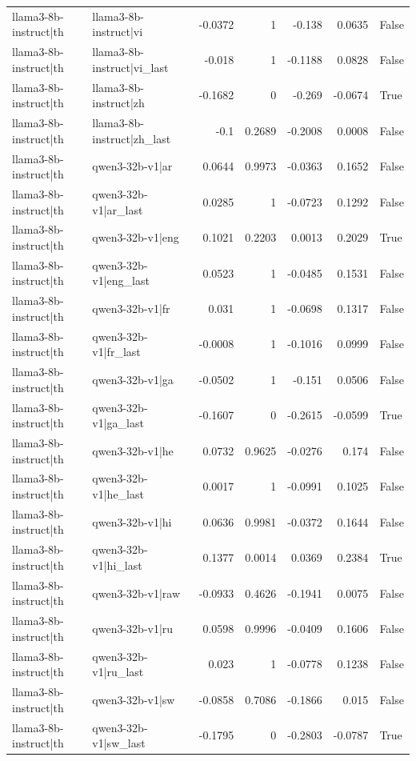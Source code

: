 \begin{table}
\begin{tabular}{l l r r r r l}
llama3-8b-instruct|th & llama3-8b-instruct|vi & -0.0372 & 1 & -0.138 & 0.0635 & False \\
llama3-8b-instruct|th & llama3-8b-instruct|vi_last & -0.018 & 1 & -0.1188 & 0.0828 & False \\
llama3-8b-instruct|th & llama3-8b-instruct|zh & -0.1682 & 0 & -0.269 & -0.0674 & True \\
llama3-8b-instruct|th & llama3-8b-instruct|zh_last & -0.1 & 0.2689 & -0.2008 & 0.0008 & False \\
llama3-8b-instruct|th & qwen3-32b-v1|ar & 0.0644 & 0.9973 & -0.0363 & 0.1652 & False \\
llama3-8b-instruct|th & qwen3-32b-v1|ar_last & 0.0285 & 1 & -0.0723 & 0.1292 & False \\
llama3-8b-instruct|th & qwen3-32b-v1|eng & 0.1021 & 0.2203 & 0.0013 & 0.2029 & True \\
llama3-8b-instruct|th & qwen3-32b-v1|eng_last & 0.0523 & 1 & -0.0485 & 0.1531 & False \\
llama3-8b-instruct|th & qwen3-32b-v1|fr & 0.031 & 1 & -0.0698 & 0.1317 & False \\
llama3-8b-instruct|th & qwen3-32b-v1|fr_last & -0.0008 & 1 & -0.1016 & 0.0999 & False \\
llama3-8b-instruct|th & qwen3-32b-v1|ga & -0.0502 & 1 & -0.151 & 0.0506 & False \\
llama3-8b-instruct|th & qwen3-32b-v1|ga_last & -0.1607 & 0 & -0.2615 & -0.0599 & True \\
llama3-8b-instruct|th & qwen3-32b-v1|he & 0.0732 & 0.9625 & -0.0276 & 0.174 & False \\
llama3-8b-instruct|th & qwen3-32b-v1|he_last & 0.0017 & 1 & -0.0991 & 0.1025 & False \\
llama3-8b-instruct|th & qwen3-32b-v1|hi & 0.0636 & 0.9981 & -0.0372 & 0.1644 & False \\
llama3-8b-instruct|th & qwen3-32b-v1|hi_last & 0.1377 & 0.0014 & 0.0369 & 0.2384 & True \\
llama3-8b-instruct|th & qwen3-32b-v1|raw & -0.0933 & 0.4626 & -0.1941 & 0.0075 & False \\
llama3-8b-instruct|th & qwen3-32b-v1|ru & 0.0598 & 0.9996 & -0.0409 & 0.1606 & False \\
llama3-8b-instruct|th & qwen3-32b-v1|ru_last & 0.023 & 1 & -0.0778 & 0.1238 & False \\
llama3-8b-instruct|th & qwen3-32b-v1|sw & -0.0858 & 0.7086 & -0.1866 & 0.015 & False \\
llama3-8b-instruct|th & qwen3-32b-v1|sw_last & -0.1795 & 0 & -0.2803 & -0.0787 & True \\

\end{tabular}
\end{table}
